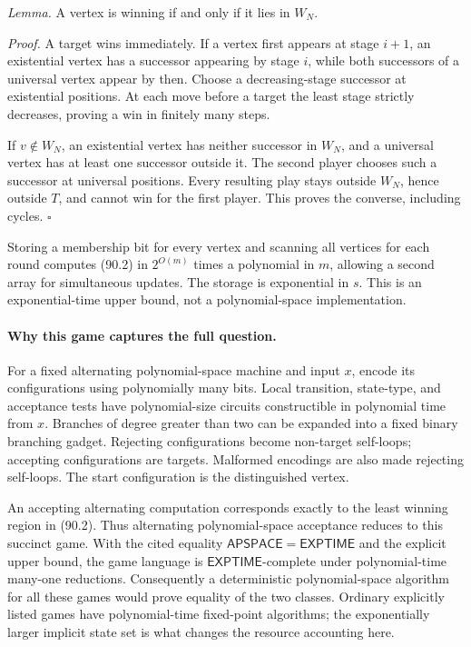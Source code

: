\documentclass[11pt]{article}
\begin{document}
\emph{Lemma.} A vertex is winning if and only if it lies in $W_N$.

\emph{Proof.} A target wins immediately. If a vertex first appears at stage $i+1$, an existential vertex has a successor appearing by stage $i$, while both successors of a universal vertex appear by then. Choose a decreasing-stage successor at existential positions. At each move before a target the least stage strictly decreases, proving a win in finitely many steps.

If $v\notin W_N$, an existential vertex has neither successor in $W_N$, and a universal vertex has at least one successor outside it. The second player chooses such a successor at universal positions. Every resulting play stays outside $W_N$, hence outside $T$, and cannot win for the first player. This proves the converse, including cycles. \hfill$\square$

Storing a membership bit for every vertex and scanning all vertices for each round computes (90.2) in $2^{O(m)}$ times a polynomial in $m$, allowing a second array for simultaneous updates. The storage is exponential in $s$. This is an exponential-time upper bound, not a polynomial-space implementation.

\paragraph{Why this game captures the full question.}
For a fixed alternating polynomial-space machine and input $x$, encode its configurations using polynomially many bits. Local transition, state-type, and acceptance tests have polynomial-size circuits constructible in polynomial time from $x$. Branches of degree greater than two can be expanded into a fixed binary branching gadget. Rejecting configurations become non-target self-loops; accepting configurations are targets. Malformed encodings are also made rejecting self-loops. The start configuration is the distinguished vertex.

An accepting alternating computation corresponds exactly to the least winning region in (90.2). Thus alternating polynomial-space acceptance reduces to this succinct game. With the cited equality $\mathsf{APSPACE}=\mathsf{EXPTIME}$ and the explicit upper bound, the game language is $\mathsf{EXPTIME}$-complete under polynomial-time many-one reductions. Consequently a deterministic polynomial-space algorithm for all these games would prove equality of the two classes. Ordinary explicitly listed games have polynomial-time fixed-point algorithms; the exponentially larger implicit state set is what changes the resource accounting here.
\end{document}
